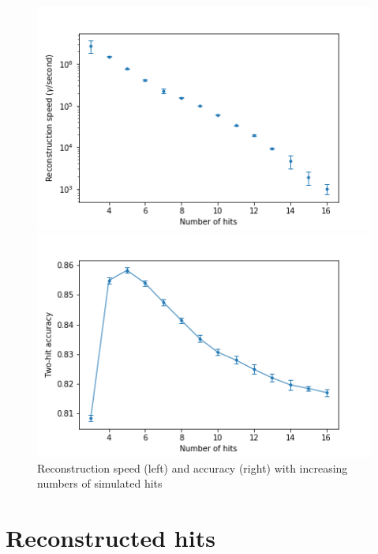 \begin{figure}
    \centering
    \begin{minipage}{0.49\textwidth} \centering
        \includegraphics[width=\textwidth]{graphs/pi_hits_speed.png}
        \end{minipage}
        \begin{minipage}{0.49\textwidth} \centering
        \includegraphics[width=\textwidth]{graphs/pi_hits_acc.png}
        \end{minipage}
        \caption{Reconstruction speed (left) and accuracy (right) with increasing numbers of simulated hits}
        \label{fig:hits_sim}
\end{figure}


\section{Reconstructed hits}
\label{reconhits}

